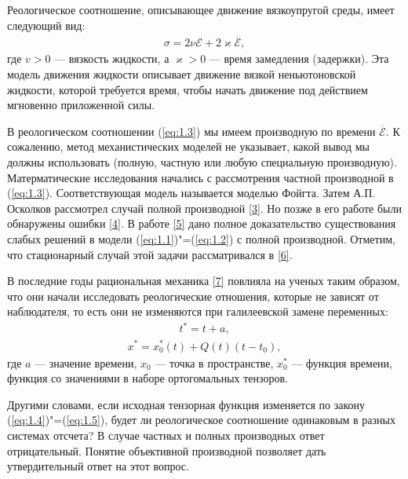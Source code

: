 Реологическое соотношение, описывающее движение вязкоупругой среды, имеет следующий вид:
\begin{equation}\label{eq:1.3}
    \begin{gathered}
        \sigma=2\nu\mathcal{E}+2\varkappa\stackrel{.}{\mathcal{E}},
    \end{gathered}
\end{equation}
где $v> 0$ --- вязкость жидкости, а $\varkappa> 0$ --- время замедления (задержки). Эта модель движения жидкости
описывает движение вязкой неньютоновской жидкости, которой требуется время, чтобы начать движение под действием мгновенно
приложенной силы.

В реологическом соотношении (\ref{eq:1.3}) мы имеем производную по времени $\stackrel{.}{\mathcal{E}}$. К сожалению,
метод механистических моделей не указывает, какой вывод мы должны использовать (полную, частную или любую специальную 
производную). Матерматические исследования начались с рассмотрения частной производной в (\ref{eq:1.3}).
Соответствующая модель называется моделью Фойгта. Затем А.П. Осколков рассмотрел случай полной производной \hyperlink{L3}{[3]}.
Но позже в его работе были обнаружены ошибки \hyperlink{L4}{[4]}. В работе \hyperlink{L5}{[5]} дано полное доказательство существования слабых решений
в модели (\ref{eq:1.1})"=(\ref{eq:1.2}) с полной производной. Отметим, что стационарный случай этой задачи рассматривался
в \hyperlink{L6}{[6]}.

В последние годы рациональная механика \hyperlink{L7}{[7]} повлияла на ученых таким образом, что они начали исследовать реологические
отношения, которые не зависят от наблюдателя, то есть они не изменяются при галилеевской замене переменных:
\begin{equation}\label{eq:1.4}
    \begin{gathered}
        t^*=t+a,
    \end{gathered}
\end{equation}
\begin{equation}\label{eq:1.5}
    \begin{gathered}
        x^*=x^*_0(t)+Q(t)(t-t_0),
    \end{gathered}
\end{equation}
где $a$ --- значение времени, $x_0$ --- точка в пространстве, $x^*_0$ --- функция времени, функция со значениями в наборе 
ортогомальных тензоров. 

Другими словами, если исходная тензорная функция изменяется по закону (\ref{eq:1.4})"=(\ref{eq:1.5}), 
будет ли реологическое соотношение одинаковым в разных системах отсчета? В случае частных и полных производных ответ 
отрицательный. Понятие объективной производной позволяет дать утвердительный ответ на этот вопрос.

